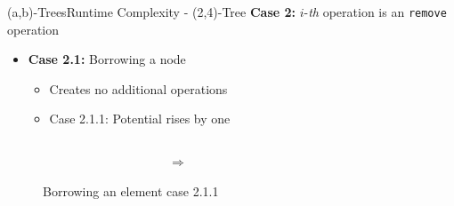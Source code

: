 \begin{frame}{(a,b)-Trees}{Runtime Complexity - (2,4)-Tree}
  \textbf{Case 2:}
  {\color{Mittel-Blau}$i$}-\textit{th} operation is an
  \texttt{\color{Mittel-Blau}remove} operation
  \begin{itemize}
    \item<2->
      \textbf{Case 2.1:} Borrowing a node
      \begin{itemize}
        \item<3->
          Creates no additional operations
        \item<4->
          Case 2.1.1: Potential rises by one
      \end{itemize}
  \end{itemize}
  \begin{figure}
    \begin{columns}
      \begin{column}{0.35\linewidth}
        \begin{adjustbox}{width=\linewidth}
          
        \end{adjustbox}
      \end{column}
      \begin{column}{0.1\linewidth}
        \begin{center}
          $\Rightarrow$
        \end{center}
      \end{column}
      \begin{column}{0.35\linewidth}
        \begin{adjustbox}{width=\linewidth}
          
        \end{adjustbox}
      \end{column}
    \end{columns}
    \caption{Borrowing an element case 2.1.1}
    \label{fig:a_b_tree:move_potential_1}
  \end{figure}
\end{frame}


